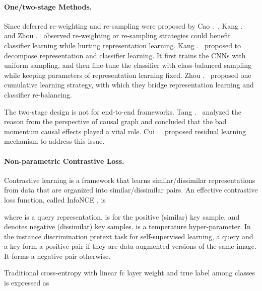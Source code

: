\documentclass[10pt,twocolumn,letterpaper]{article}
\begin{document}
\paragraph{One/two-stage Methods.}
Since deferred re-weighting and re-sampling were proposed by Cao \etal.~\cite{DBLP:conf/nips/CaoWGAM19}, Kang \etal.~\cite{DBLP:conf/iclr/KangXRYGFK20} and Zhou \etal.~\cite{zhou2019bbn} observed re-weighting or re-sampling strategies could benefit classifier learning while hurting representation learning. Kang \etal.~\cite{DBLP:conf/iclr/KangXRYGFK20} proposed to decompose representation and classifier learning. It first trains the CNNs with uniform sampling, and then fine-tune the classifier with class-balanced sampling while keeping parameters of representation learning fixed. Zhou \etal.~\cite{zhou2019bbn} proposed one cumulative learning strategy, with which they bridge representation learning and classifier re-balancing.

The two-stage design is not for end-to-end frameworks.
Tang \etal.~\cite{DBLP:conf/nips/TangHZ20} analyzed the reason from the perspective of causal graph and concluded that the bad momentum causal effects played a vital role.
Cui \etal.~\cite{DBLP:journals/corr/abs-2101-10633} proposed residual learning mechanism to address this issue.

\paragraph{Non-parametric Contrastive Loss.}
\label{Sec:contrastive_learning}
Contrastive learning \cite{DBLP:conf/icml/ChenK0H20, DBLP:conf/cvpr/He0WXG20, DBLP:journals/corr/abs-2003-04297, DBLP:conf/nips/GrillSATRBDPGAP20, DBLP:conf/nips/CaronMMGBJ20} is a framework that learns similar/dissimilar representations from data that are organized into similar/dissimilar pairs. An effective contrastive loss function, called InfoNCE \cite{DBLP:journals/corr/abs-1807-03748}, is

where  is a query representation,  is for the positive (similar) key sample, and  denotes negative (dissimilar) key samples.  is a temperature hyper-parameter. In the {instance discrimination} pretext task \cite{DBLP:conf/cvpr/WuXYL18} for self-supervised learning, a query and a key form a positive pair if they are data-augmented versions of the same image. It forms a negative pair otherwise. 

Traditional cross-entropy with linear fc layer weight  and true label  among  classes is expressed as 
\end{document}
